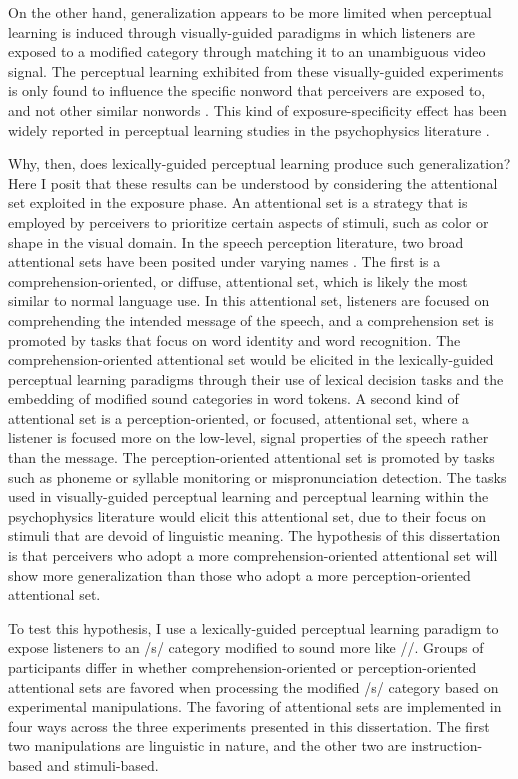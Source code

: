 On the other hand, generalization appears to be more limited when perceptual learning is induced through visually-guided paradigms in which listeners are exposed to a modified category through matching it to an unambiguous video signal.  
The perceptual learning exhibited from these visually-guided experiments is only found to influence the specific nonword that perceivers are exposed to, and not other similar nonwords \citep{Reinisch2014}.  
This kind of exposure-specificity effect has been widely reported in perceptual learning studies in the psychophysics literature \citep{Gibson1953}.

Why, then, does lexically-guided perceptual learning produce such generalization?
Here I posit that these results can be understood by considering the attentional set exploited in the exposure phase.
An attentional set is a strategy that is employed by perceivers to prioritize certain aspects of stimuli, such as color or shape in the visual domain.
In the speech perception literature, two broad attentional sets have been posited under varying names \citep{Cutler1987, Pitt2012}.  
The first is a comprehension-oriented, or diffuse, attentional set, which is likely the most similar to normal language use.  
In this attentional set, listeners are focused on comprehending the intended message of the speech, and a comprehension set is promoted by tasks that focus on word identity and word recognition.
The comprehension-oriented attentional set would be elicited in the lexically-guided perceptual learning paradigms through their use of lexical decision tasks and the embedding of modified sound categories in word tokens. A second kind of attentional set is a perception-oriented, or focused, attentional set, where a listener is focused more on the low-level, signal properties of the speech rather than the message.
The perception-oriented attentional set is promoted by tasks such as phoneme or syllable monitoring or mispronunciation detection.
The tasks used in visually-guided perceptual learning and perceptual learning within the psychophysics literature would elicit this attentional set, due to their focus on stimuli that are devoid of linguistic meaning.
The hypothesis of this dissertation is that perceivers who adopt a more comprehension-oriented attentional set will show more generalization than those who adopt a more perception-oriented attentional set.

To test this hypothesis, I use a lexically-guided perceptual learning paradigm to expose listeners to an /s/ category modified to sound more like /\textesh/.  
Groups of participants differ in whether comprehension-oriented or perception-oriented attentional sets are favored when processing the modified /s/ category based on experimental manipulations.
The favoring of attentional sets are implemented in four ways across the three experiments presented in this dissertation.  
The first two manipulations are linguistic in nature, and the other two are instruction-based and stimuli-based.

